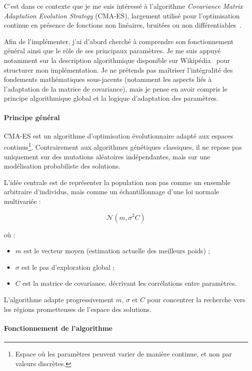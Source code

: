 \documentclass[11pt,a4paper]{article}
\begin{document}
C'est dans ce contexte que je me suis intéressé à l'algorithme \textit{Covariance Matrix Adaptation Evolution Strategy} (CMA-ES),
largement utilisé pour l'optimisation continue en présence de fonctions non linéaires, bruitées ou non différentiables~\cite{Hansen2001}.

Afin de l'implémenter, j'ai d'abord cherché à comprendre son fonctionnement général ainsi que le rôle de ses principaux
paramètres. Je me suis appuyé notamment sur la description algorithmique disponible sur Wikipédia~\cite{WikiCMAES} pour structurer mon
implémentation. Je ne prétends pas maîtriser l'intégralité des fondements mathématiques sous-jacents (notamment les aspects
liés à l'adaptation de la matrice de covariance), mais je pense en avoir compris le principe algorithmique global et la
logique d'adaptation des paramètres.

\paragraph{Principe général}

CMA-ES est un algorithme d'optimisation évolutionnaire adapté aux espaces continus\footnote{Espace où les paramètres peuvent varier de manière continue, et non par valeurs discrètes.}.
Contrairement aux algorithmes génétiques classiques, il ne repose pas uniquement sur des mutations aléatoires indépendantes,
mais sur une modélisation probabiliste des solutions.

L'idée centrale est de représenter la population non pas comme un ensemble arbitraire d'individus, mais comme un échantillonnage
d'une loi normale multivariée :

\[
\mathcal{N}(m, \sigma^2 C)
\]

où :

\begin{itemize}
  \item $m$ est le vecteur moyen (estimation actuelle des meilleurs poids) ;
  \item $\sigma$ est le pas d'exploration global ;
  \item $C$ est la matrice de covariance, décrivant les corrélations entre paramètres.
\end{itemize}

L'algorithme adapte progressivement $m$, $\sigma$ et $C$ pour concentrer la recherche vers les régions prometteuses de
l'espace des solutions.

\paragraph{Fonctionnement de l'algorithme} 
\end{document}
